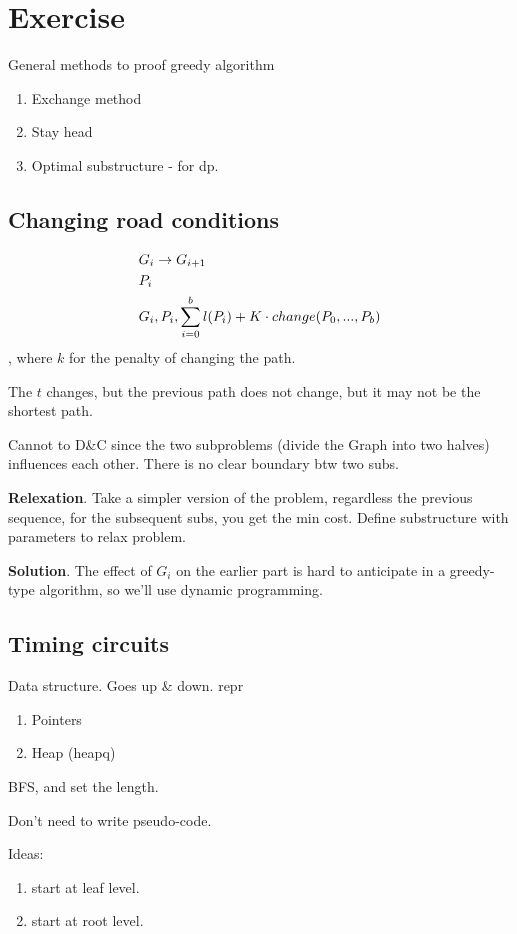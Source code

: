 \documentclass[a4paper]{report}
\theoremstyle{definition}
\begin{document}
\section{Exercise}
General methods to proof greedy algorithm
\begin{enumerate}
\item Exchange method
\item Stay head
\item Optimal substructure - for dp.
\end{enumerate}
\subsection{Changing road conditions}
\begin{align*}
& G_i \rightarrow G_{i+1}\\
& P_i \\
& G_i, P_i, \sum_{i=0}^b l(P_i)+K \cdot change(P_0, ..., P_b)
\end{align*}
, where $k$ for the penalty of changing the path.

The $t$ changes, but the previous path does not change, but it may not be the shortest path.

Cannot to D\&C since the two subproblems (divide the Graph into two halves) influences each other. There is no clear boundary btw two subs.

\textbf{Relexation}. Take a simpler version of the problem, regardless the previous sequence, for the subsequent subs, you get the min cost. Define substructure with parameters to relax problem.

\textbf{Solution}. The effect of $G_i$ on the earlier part is hard to anticipate in a greedy-type algorithm, so we'll use dynamic programming.

\subsection{Timing circuits}
Data structure. Goes up \& down. repr
\begin{enumerate}
\item Pointers
\item Heap (heapq)
\end{enumerate}

BFS, and set the length.

Don't need to write pseudo-code.

Ideas:
\begin{enumerate}
\item start at leaf level.
\item start at root level.
\end{enumerate}
\end{document}
